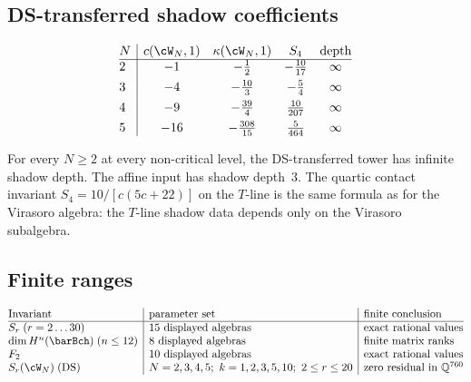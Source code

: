 \subsection{DS-transferred shadow coefficients}
\label{subsec:comp-ds-table}

\begin{table}[htbp]
\centering
\caption{DS-transferred $T$-line shadow data for $\cW_N$
at $k = 1$. Central charge
$c = (N{-}1)(1 - N(N{+}1)/(k{+}N)) = -(N{-}1)^2$ at $k = 1$.}
\label{tab:comp-ds-transfer}
\small
\[
\begin{array}{@{}l|cccc@{}}
 N & c(\cW_N, 1) & \kappa(\cW_N, 1) & S_4 & \text{depth} \\
\hline
 2 & -1 & -\frac{1}{2} &
 -\frac{10}{17} & \infty \\[4pt]
 3 & -4 & -\frac{10}{3} &
 -\frac{5}{4} & \infty \\[4pt]
 4 & -9 & -\frac{39}{4} &
 \frac{10}{207} & \infty \\[4pt]
 5 & -16 & -\frac{308}{15} &
 \frac{5}{464} & \infty
\end{array}
\]
\end{table}

\begin{remark}
\label{rem:comp-depth-increase}
For every $N \geq 2$ at every non-critical level, the
DS-transferred tower has infinite shadow depth. The affine input
has shadow depth~$3$. The quartic contact invariant
$S_4 = 10/[c(5c+22)]$ on the $T$-line is the same formula
as for the Virasoro algebra: the $T$-line shadow data depends
only on the Virasoro subalgebra.
\end{remark}


\subsection{Finite ranges}
\label{subsec:comp-summary}

\begin{table}[htbp]
\centering
\caption{Finite ranges of the exact calculations in this chapter.}
\label{tab:comp-methods-summary}
\small
\[
\begin{array}{@{}l|l|l@{}}
 \text{Invariant}&\text{parameter set}&\text{finite conclusion} \\
\hline
 S_r \; (r = 2 \ldots 30)
 & \text{15 displayed algebras}&\text{exact rational values} \\
 \dim H^n(\barBch) \; (n \leq 12)
 & \text{8 displayed algebras}&\text{finite matrix ranks} \\
 F_2
 & \text{10 displayed algebras}&\text{exact rational values} \\
 S_r(\cW_N) \; (\text{DS})
 & N=2,3,4,5;\ k=1,2,3,5,10;\ 2\le r\le20
 & \text{zero residual in }\mathbb Q^{760}
\end{array}
\]
\end{table}


